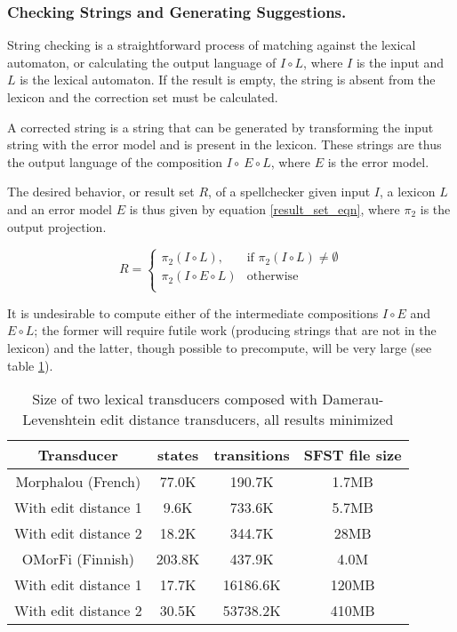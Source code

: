 \documentclass{llncs}
\begin{document}
\subsubsection{Checking Strings and Generating Suggestions.}

String checking is a straightforward process of matching against the lexical
automaton, or calculating the output language of $I \circ L$, where $I$ is the
input and $L$ is the lexical automaton. If the result is empty, the
string is absent from the lexicon and the correction set must be calculated.

A corrected string is a string that can be generated by transforming the
input string with the error model and is present in the lexicon.
These strings are thus the output language of the composition
$I \circ \ E \circ L$, where $E$ is the error model.

The desired behavior, or result set $R$, of a spellchecker given input $I$, a
lexicon $L$ and an error model $E$ is thus given by equation \ref{result_set_eqn},
where $\pi_2$ is the output projection.

\begin{equation}
  \label{result_set_eqn}
  R = \begin{cases}
    \pi_2(I \circ L), & \mbox{if } \pi_2(I \circ L) \neq \emptyset \\
    \pi_2(I \circ E \circ L) & \mbox{otherwise}\\
  \end{cases}
\end{equation}

It is undesirable to compute either of the intermediate compositions
$I \circ E$ and $E \circ L$; the former will require futile work (producing
strings that are not in the lexicon) and the latter, though possible to
precompute, will be very large (see table \ref{composed_error_table}).

\begin{table}
  \centering
  \caption{Size of two lexical transducers composed with
    Damerau-Levenshtein edit distance transducers, all results minimized}
  \label{composed_error_table}
  \begin{tabular}{ c c c c }
    \hline
    Transducer               & states   & transitions & SFST file size \\ \hline
    Morphalou (French)       & 77.0K    & 190.7K   & 1.7MB \\
    With edit distance 1     & 9.6K     & 733.6K   & 5.7MB \\
    With edit distance 2     & 18.2K    & 344.7K  & 28MB \\ \hline
    OMorFi (Finnish)         & 203.8K   & 437.9K   & 4.0M \\
    With edit distance 1     & 17.7K    & 16186.6K & 120MB \\
    With edit distance 2     & 30.5K    & 53738.2K & 410MB \\ \hline
  \end{tabular}

\end{table}
\end{document}
